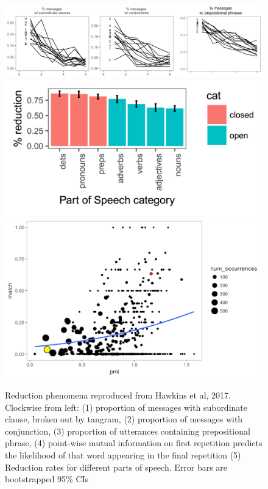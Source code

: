 \documentclass[11pt]{article}
\begin{document}
\begin{figure}[t]
\includegraphics[scale=.35]{tangrams_results.png}
\includegraphics[scale=.25]{pos_fig.pdf}
\includegraphics[scale=.25]{pmi.pdf}
\caption{Reduction phenomena reproduced from Hawkins et al, 2017. Clockwise from left: (1) proportion of messages with subordinate clause, broken out by tangram, (2) proportion of messages with conjunction, (3) proportion of utterances containing prepositional phrase, (4) point-wise mutual information on first repetition predicts the likelihood of that word appearing in the final repetition (5) Reduction rates for different parts of speech. Error bars are bootstrapped 95\% CIs}
\label{fig:tangramsresults}
\end{figure}
\end{document}
